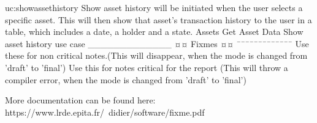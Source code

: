         {uc:showassethistory}
        {Show asset history will be initiated when the user selects a specific asset. This will then show that asset's transaction history to the user in a table, which includes a date, a holder and a state.}
        {Assets}
        {Get Asset Data}
        {Show asset history use case}
_____________
¤¤ Fixmes ¤¤
¯¯¯¯¯¯¯¯¯¯¯¯¯
Use these for non critical notes.(This will disappear, when the mode is changed from 'draft' to 'final')
Use this for notes critical for the report (This will throw a compiler error, when the mode is changed from 'draft' to 'final')

More documentation can be found here: https://www.lrde.epita.fr/~didier/software/fixme.pdf